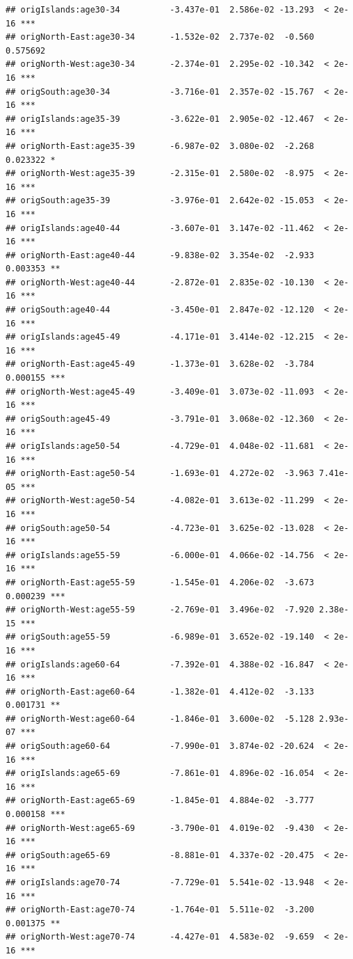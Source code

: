 \documentclass[
]{book}
\begin{document}
\begin{verbatim}
## origIslands:age30-34          -3.437e-01  2.586e-02 -13.293  < 2e-16 ***
## origNorth-East:age30-34       -1.532e-02  2.737e-02  -0.560 0.575692    
## origNorth-West:age30-34       -2.374e-01  2.295e-02 -10.342  < 2e-16 ***
## origSouth:age30-34            -3.716e-01  2.357e-02 -15.767  < 2e-16 ***
## origIslands:age35-39          -3.622e-01  2.905e-02 -12.467  < 2e-16 ***
## origNorth-East:age35-39       -6.987e-02  3.080e-02  -2.268 0.023322 *  
## origNorth-West:age35-39       -2.315e-01  2.580e-02  -8.975  < 2e-16 ***
## origSouth:age35-39            -3.976e-01  2.642e-02 -15.053  < 2e-16 ***
## origIslands:age40-44          -3.607e-01  3.147e-02 -11.462  < 2e-16 ***
## origNorth-East:age40-44       -9.838e-02  3.354e-02  -2.933 0.003353 ** 
## origNorth-West:age40-44       -2.872e-01  2.835e-02 -10.130  < 2e-16 ***
## origSouth:age40-44            -3.450e-01  2.847e-02 -12.120  < 2e-16 ***
## origIslands:age45-49          -4.171e-01  3.414e-02 -12.215  < 2e-16 ***
## origNorth-East:age45-49       -1.373e-01  3.628e-02  -3.784 0.000155 ***
## origNorth-West:age45-49       -3.409e-01  3.073e-02 -11.093  < 2e-16 ***
## origSouth:age45-49            -3.791e-01  3.068e-02 -12.360  < 2e-16 ***
## origIslands:age50-54          -4.729e-01  4.048e-02 -11.681  < 2e-16 ***
## origNorth-East:age50-54       -1.693e-01  4.272e-02  -3.963 7.41e-05 ***
## origNorth-West:age50-54       -4.082e-01  3.613e-02 -11.299  < 2e-16 ***
## origSouth:age50-54            -4.723e-01  3.625e-02 -13.028  < 2e-16 ***
## origIslands:age55-59          -6.000e-01  4.066e-02 -14.756  < 2e-16 ***
## origNorth-East:age55-59       -1.545e-01  4.206e-02  -3.673 0.000239 ***
## origNorth-West:age55-59       -2.769e-01  3.496e-02  -7.920 2.38e-15 ***
## origSouth:age55-59            -6.989e-01  3.652e-02 -19.140  < 2e-16 ***
## origIslands:age60-64          -7.392e-01  4.388e-02 -16.847  < 2e-16 ***
## origNorth-East:age60-64       -1.382e-01  4.412e-02  -3.133 0.001731 ** 
## origNorth-West:age60-64       -1.846e-01  3.600e-02  -5.128 2.93e-07 ***
## origSouth:age60-64            -7.990e-01  3.874e-02 -20.624  < 2e-16 ***
## origIslands:age65-69          -7.861e-01  4.896e-02 -16.054  < 2e-16 ***
## origNorth-East:age65-69       -1.845e-01  4.884e-02  -3.777 0.000158 ***
## origNorth-West:age65-69       -3.790e-01  4.019e-02  -9.430  < 2e-16 ***
## origSouth:age65-69            -8.881e-01  4.337e-02 -20.475  < 2e-16 ***
## origIslands:age70-74          -7.729e-01  5.541e-02 -13.948  < 2e-16 ***
## origNorth-East:age70-74       -1.764e-01  5.511e-02  -3.200 0.001375 ** 
## origNorth-West:age70-74       -4.427e-01  4.583e-02  -9.659  < 2e-16 ***

\end{verbatim}
\end{document}
